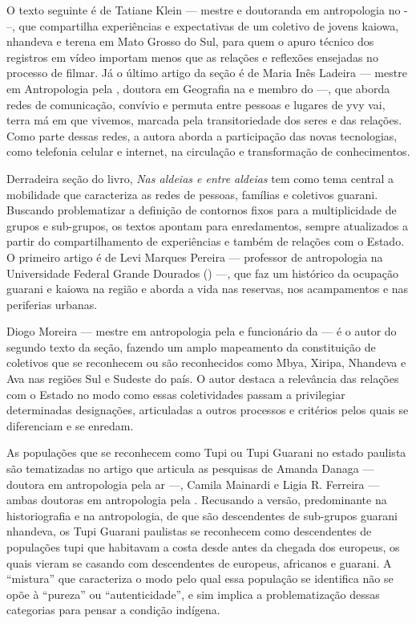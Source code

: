 O texto seguinte é de Tatiane Klein — mestre e doutoranda em
antropologia no - –, que compartilha experiências e
expectativas de um coletivo de jovens kaiowa, nhandeva e terena em Mato
Grosso do Sul, para quem o apuro técnico dos registros em vídeo
importam menos que as relações e reflexões ensejadas no processo de
filmar. Já o último artigo da seção é de Maria Inês Ladeira — mestre em
Antropologia pela , doutora em Geografia na  e membro do  —,
que aborda redes de comunicação, convívio e permuta entre pessoas e
lugares de yvy vai, terra má em que vivemos, marcada pela
transitoriedade dos seres e das relações. Como parte dessas redes, a
autora aborda a participação das novas tecnologias, como telefonia
celular e internet, na circulação e transformação de conhecimentos.

Derradeira seção do livro, \emph{Nas aldeias e entre aldeias} tem como tema
central a mobilidade que caracteriza as redes de pessoas, famílias e
coletivos guarani. Buscando problematizar a definição de contornos
fixos para a multiplicidade de grupos e sub-grupos, os textos apontam
para enredamentos, sempre atualizados a partir do compartilhamento de
experiências e também de relações com o Estado. O primeiro artigo é de
Levi Marques Pereira — professor de antropologia na Universidade
Federal Grande Dourados () —, que faz um histórico da ocupação
guarani e kaiowa na região e aborda a vida nas reservas, nos
acampamentos e nas periferias urbanas. 

Diogo Moreira — mestre em antropologia pela  e funcionário da 
— é o autor do segundo texto da seção, fazendo um amplo mapeamento da
constituição de coletivos que se reconhecem ou são reconhecidos como
Mbya, Xiripa, Nhandeva e Ava nas regiões Sul e Sudeste do país. O autor
destaca a relevância das relações com o Estado no modo como essas
coletividades passam a privilegiar determinadas designações,
articuladas a outros processos e critérios pelos quais se diferenciam e
se enredam. 

As populações que se reconhecem como Tupi ou Tupi Guarani no estado
paulista são tematizadas no artigo que articula as pesquisas de Amanda
Danaga — doutora em antropologia pela ar —, Camila Mainardi e Ligia
R. Ferreira — ambas doutoras em antropologia pela . Recusando a
versão, predominante na historiografia e na antropologia, de que são
descendentes de sub-grupos guarani nhandeva, os Tupi Guarani paulistas
se reconhecem como descendentes de populações tupi que habitavam a
costa desde antes da chegada dos europeus, os quais vieram se casando
com descendentes de europeus, africanos e guarani. A ``mistura'' que
caracteriza o modo pelo qual essa população se identifica não se opõe à
``pureza'' ou ``autenticidade'', e sim implica a problematização dessas
categorias para pensar a condição indígena. 

